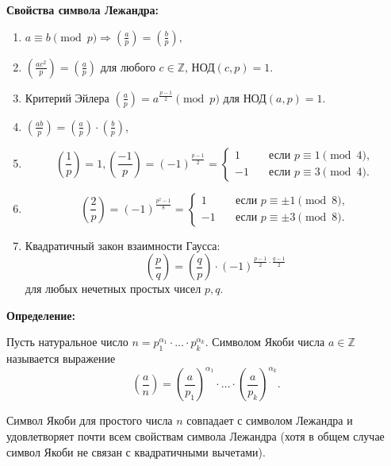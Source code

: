 \documentclass[bachelor, och, labwork]{shiza}
\begin{document}
        \textbf{Свойства символа Лежандра:}

        \begin{enumerate}
            \item $a \equiv b \pmod p \Longrightarrow  \left(\frac{a}{p}\right) = \left(\frac{b}{p}\right),$
            \item $\left(\frac{ac^2}{p}\right) = \left(\frac{a}{p}\right)$ для любого $c \in \mathbb{Z}$, НОД$(c, p) = 1.$
            \item Критерий Эйлера $\left(\frac{a}{p}\right) = a^{\frac{p - 1}{2}} \pmod p$ для НОД$(a, p) = 1.$
            \item $\left(\frac{ab}{p}\right) = \left(\frac{a}{p}\right) \cdot \left(\frac{b}{p}\right)$,
            \item \[\left(\frac{1}{p}\right) = 1, \left(\frac{-1}{p}\right) = (-1)^{\frac{p-1}{2}} = 
            \begin{cases}
                1 & \quad \text{если } p \equiv 1 \pmod 4,\\
                -1 & \quad \text{если } p \equiv 3 \pmod 4.
            \end{cases}\]
            \item \[\left(\frac{2}{p}\right) = (-1)^{\frac{p^2 - 1}{8}} = 
            \begin{cases}
                1 & \quad \text{если } p \equiv \pm 1 \pmod 8,\\
                -1 & \quad \text{если } p \equiv \pm 3 \pmod 8.
            \end{cases}\]
            \item Квадратичный закон взаимности Гаусса:
            $$\left(\frac{p}{q}\right) = \left(\frac{q}{p}\right) \cdot
            (-1)^{\frac{p-1}{2} \cdot \frac{q-1}{2}}$$ для любых нечетных
            простых чисел $p, q.$
        \end{enumerate}

        \textbf{Определение:}
        
        Пусть натуральное число $n = p_1^{\alpha_1} \cdot \dots \cdot
        p_k^{\alpha_k}.$ Символом Якоби числа $a \in \mathbb{Z}$ называется
        выражение $$\left(\frac{a}{n}\right) =
        \left(\frac{a}{p_1}\right)^{\alpha_1} \cdot \dots \cdot
        \left(\frac{a}{p_k}\right)^{\alpha_k}.$$

        Символ Якоби для простого числа $n$ совпадает с символом Лежандра и
        удовлетворяет почти всем свойствам символа Лежандра (хотя в общем случае
        символ Якоби не связан с квадратичными вычетами).
\end{document}
